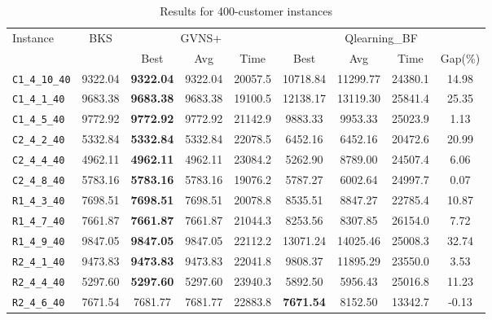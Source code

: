 \begin{table}[ht]
\centering
\small
\setlength{\tabcolsep}{5pt}
\caption{Results for 400-customer instances}
\vspace{4mm}
\begin{adjustbox}{width=\textwidth}
\begin{tabular}{l c c c c @{\hspace{8pt}} c c c c @{\hspace{8pt}}}
\toprule
\multirow{2}{*}{Instance} & \multirow{2}{*}{BKS} & \multicolumn{3}{c}{GVNS+} & \multicolumn{4}{c}{Qlearning\_BF} \\
\cmidrule(lr){3-5} \cmidrule(lr){6-9}
 &  & Best & Avg & Time & Best & Avg & Time & Gap(\%) \\
\midrule
\texttt{C1\_4\_10\_40} & 9322.04 & \textbf{9322.04} & 9322.04 & 20057.5 & 10718.84 & 11299.77 & 24380.1 & 14.98 \\
\texttt{C1\_4\_1\_40} & 9683.38 & \textbf{9683.38} & 9683.38 & 19100.5 & 12138.17 & 13119.30 & 25841.4 & 25.35 \\
\texttt{C1\_4\_5\_40} & 9772.92 & \textbf{9772.92} & 9772.92 & 21142.9 & 9883.33 & 9953.33 & 25023.9 & 1.13 \\
\texttt{C2\_4\_2\_40} & 5332.84 & \textbf{5332.84} & 5332.84 & 22078.5 & 6452.16 & 6452.16 & 20472.6 & 20.99 \\
\texttt{C2\_4\_4\_40} & 4962.11 & \textbf{4962.11} & 4962.11 & 23084.2 & 5262.90 & 8789.00 & 24507.4 & 6.06 \\
\texttt{C2\_4\_8\_40} & 5783.16 & \textbf{5783.16} & 5783.16 & 19076.2 & 5787.27 & 6002.64 & 24997.7 & 0.07 \\
\texttt{R1\_4\_3\_40} & 7698.51 & \textbf{7698.51} & 7698.51 & 20078.8 & 8535.51 & 8847.27 & 22785.4 & 10.87 \\
\texttt{R1\_4\_7\_40} & 7661.87 & \textbf{7661.87} & 7661.87 & 21044.3 & 8253.56 & 8307.85 & 26154.0 & 7.72 \\
\texttt{R1\_4\_9\_40} & 9847.05 & \textbf{9847.05} & 9847.05 & 22112.2 & 13071.24 & 14025.46 & 25008.3 & 32.74 \\
\texttt{R2\_4\_1\_40} & 9473.83 & \textbf{9473.83} & 9473.83 & 22041.8 & 9808.37 & 11895.29 & 23550.0 & 3.53 \\
\texttt{R2\_4\_4\_40} & 5297.60 & \textbf{5297.60} & 5297.60 & 23940.3 & 5892.50 & 5956.43 & 25016.8 & 11.23 \\
\texttt{R2\_4\_6\_40} & 7671.54 & 7681.77 & 7681.77 & 22883.8 & \textbf{7671.54} & 8152.50 & 13342.7 & -0.13 \\

\end{tabular}
\end{adjustbox}
\end{table}
